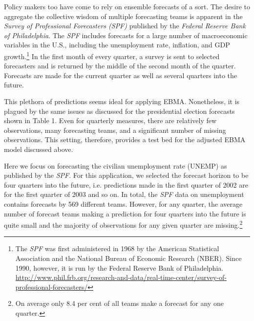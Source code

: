 \documentclass[12pt,fullpage,endnotes]{article}
\begin{document}
Policy makers too have come to rely on ensemble forecasts of a sort.
The desire to aggregate the collective wisdom of multiple forecasting
teams is apparent in the \textit{Survey of Professional Forecasters
  (SPF)} published by the \textit{Federal Reserve Bank of
  Philadelphia}.  The \textit{SPF} includes forecasts for a large
number of macroeconomic variables in the U.S., including the
unemployment rate, inflation, and GDP growth.\footnote{The
  \textit{SPF} was first administered in 1968 by the American
  Statistical Association and the National Bureau of Economic Research
  (NBER).  Since 1990, however, it is run by the Federal
  Reserve Bank of Philadelphia.
  \url{http://www.phil.frb.org/research-and-data/real-time-center/survey-of-professional-forecasters/}}
In the first month of every quarter, a survey is sent to selected
forecasters and is returned by the middle of the second month of the
quarter. Forecasts are made for the current quarter as well as several
quarters into the future.

This plethora of predictions seems ideal for applying EBMA.  Nonetheless,
it is plagued by the same issues as discussed for the presidential
election forecasts shown in Table 1.  Even for quarterly measures,
there are relatively few observations, many forecasting teams, and a
significant number of missing observations.  This setting, therefore,
provides a test bed for the adjusted EBMA model discussed
above.

Here we focus on forecasting the civilian unemployment rate (UNEMP) as
published by the \textit{SPF}. For this application, we selected the
forecast horizon to be four quarters into the future, i.e. predictions
made in the first quarter of 2002 are for the first quarter of 2003
and so on. In total, the \textit{SPF} data on unemployment contains
forecasts by 569 different teams. However, for any quarter, the
average number of forecast teams making a prediction for four quarters
into the future is quite small and the majority of observations for
any given quarter are missing.\footnote{On average only 8.4 per cent
  of all teams make a forecast for any one quarter.}
\end{document}
